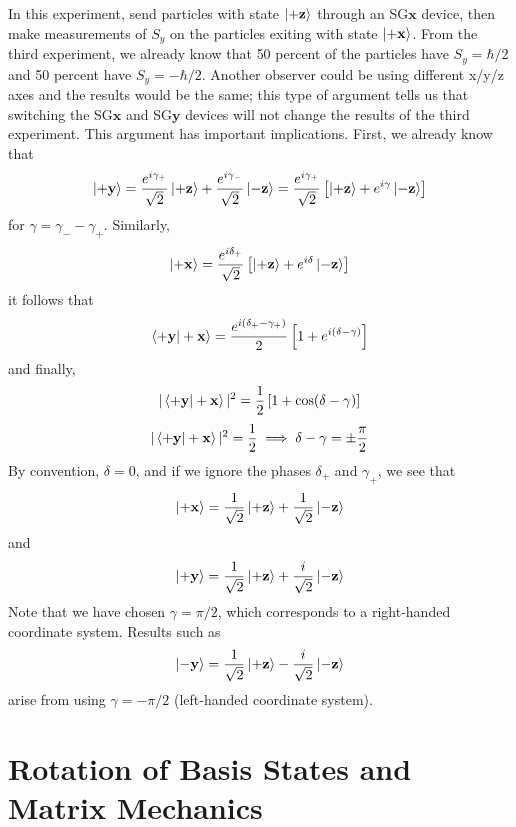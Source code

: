 \documentclass{report}
\begin{document}
	In this experiment, send particles with state \(\ket{+ \mathbf z}\) through an SG\(\mathbf x\) device, then make measurements of \(S_y\) on the particles exiting with state \(\ket{+ \mathbf x}\). From the third experiment, we already know that 50 percent of the particles have \(S_y = \hbar/2\) and 50 percent have \(S_y = - \hbar/2\). Another observer could be using different x/y/z axes and the results would be the same; this type of argument tells us that switching the SG\(\mathbf x\) and SG\(\mathbf y\) devices will not change the results of the third experiment. This argument has important implications. First, we already know that 
\[
	\ket{+ \mathbf y} = \frac{e^{i \gamma _+}}{\sqrt 2}\ket{+ \mathbf z} + \frac{e^{i \gamma _-}}{\sqrt 2}\ket{- \mathbf z} = \frac{e^{i \gamma_+}}{\sqrt 2}\left[ \ket{+ \mathbf z} + e^{i \gamma} \ket{ - \mathbf z}\right]
\] 
for \(\gamma = \gamma_- - \gamma_+\). Similarly, 
\[
	\ket{+ \mathbf x} = \frac{e^{i \delta_+}}{\sqrt 2} \left[ \ket{+ \mathbf z} + e^{i \delta} \ket{- \mathbf z} \right]
\] 
it follows that 
\[
\braket{+ \mathbf y | + \mathbf x} = \frac{e^{i(\delta_+ - \gamma_+)}}{2}\left[1 + e^{i(\delta - \gamma)}\right]
\] 
and finally,
\[
	|\braket{+ \mathbf y | + \mathbf x}|^2 = \frac{1}{2}\left[1 + \cos(\delta - \gamma) \right] 
\] 
\[
	|\braket{+ \mathbf y | + \mathbf x}|^2 = \frac{1}{2} \implies \delta - \gamma = \pm \frac{\pi}{2} 
\]
By convention, \(\delta = 0\), and if we ignore the phases \(\delta_+\) and \(\gamma_+\), we see that
\[
\ket{+ \mathbf x} = \frac{1}{\sqrt 2}\ket{+ \mathbf z} + \frac{1}{\sqrt 2}\ket{ - \mathbf z} 
\] 
and 
\[
\ket{+ \mathbf y} = \frac{1}{\sqrt 2} \ket{+ \mathbf z} + \frac{i}{\sqrt 2}\ket{ - \mathbf z}
\] 
Note that we have chosen \(\gamma = \pi/2\), which corresponds to a right-handed coordinate system. Results such as 
\[\ket{- \mathbf y}= \frac{1}{\sqrt2} \ket{+ \mathbf z} - \frac{i}{\sqrt 2} \ket{- \mathbf z}\]
arise from using \(\gamma = - \pi/2\) (left-handed coordinate system). 


\chapter{Rotation of Basis States and Matrix Mechanics}
\end{document}
